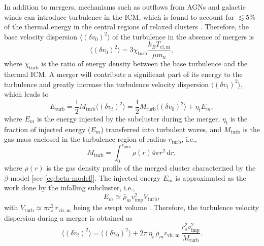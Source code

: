 \documentclass[twocolumn]{aastex62}
\newcommand{\R}[1]{\mathrm{#1}}
\newcommand{\D}[1]{\R{d} #1}
\begin{document}
In addition to mergers, mechanisms such as outflows from AGNs and galactic
winds can introduce turbulence in the ICM, which is found to account for
$\lesssim 5\%$ of the thermal energy in the central regions
of relaxed clusters \citep[e.g.,][]{vazza2011}.
Therefore, the base velocity dispersion $\langle (\delta v_0)^2 \rangle$
of the turbulence in the absence of mergers is
\begin{equation}
  \label{eq:v-turb-base}
  \langle (\delta v_0)^2 \rangle
    = 3 \chi_{\R{turb}} \frac{k_B T_{\R{cl,m}}}{\mu m_u} ,
\end{equation}
where
$\chi_{\R{turb}}$ is the ratio of energy density between the base
turbulence and the thermal ICM.
A merger will contribute a significant part of its energy to the turbulence
and greatly increase the turbulence velocity dispersion
$\langle (\delta v_t)^2 \rangle$, which leads to
\begin{equation}
  \label{eq:energy-turb}
  E_{\R{turb}} =
    \frac{1}{2} M_{\R{turb}} \langle (\delta v_t)^2 \rangle =
    \frac{1}{2} M_{\R{turb}} \langle (\delta v_0)^2 \rangle + \eta_t E_m ,
\end{equation}
where
$E_m$ is the energy injected by the subcluster during the merger,
$\eta_t$ is the fraction of injected energy ($E_m$) transferred into
turbulent waves,
and $M_{\R{turb}}$ is the gas mass enclosed in the turbulence region
of radius $r_{\R{turb}}$, i.e.,
\begin{equation}
  \label{eq:mass-turb}
  M_{\R{turb}} = \int_0^{r_{\R{turb}}} \! \rho(r) 4\pi r^2 \,\D{r},
\end{equation}
where $\rho(r)$ is the gas density profile of the merged cluster
characterized by the $\beta$-model [see \autoref{eq:beta-model}].
The injected energy $E_m$ is approximated as the work done by the infalling
subcluster, i.e.,
\begin{equation}
  \label{eq:energy-inj}
  E_m \simeq \bar{\rho}_m v_{\R{imp}}^2 V_{\R{turb}},
\end{equation}
with $V_{\R{turb}} \simeq \pi r_s^2 \,r_{\R{vir,m}}$ being the swept volume
\citep{fujita2003,cassano2005}.
Therefore, the turbulence velocity dispersion during a merger is obtained
as
\begin{equation}
  \label{eq:v-turb}
  \langle (\delta v_t)^2 \rangle
    = \langle (\delta v_0)^2 \rangle
    + 2 \pi\,\eta_t\, \bar{\rho}_m r_{\R{vir,m}}
      \,\frac{r_s^2 v_{\R{imp}}^2}{M_{\R{turb}}} .
\end{equation}
\end{document}
